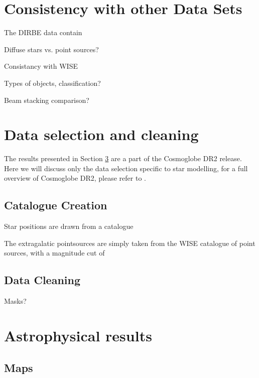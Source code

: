 \documentclass{aa}
\begin{document}
\section{Consistency with other Data Sets}
\label{sec:consistency}

The DIRBE data contain 


Diffuse stars vs. point sources? 

Consistancy with WISE

Types of objects, classification?

Beam stacking comparison?

\clearpage
\section{Data selection and cleaning}
\label{sec:data}

The results presented in Section \ref{sec:results} are a part of the Cosmoglobe DR2 release. Here we will discuss only the data selection specific to star modelling, for a full overview of Cosmoglobe DR2, please refer to  \cite{CG02_01}.

\subsection{Catalogue Creation}
\label{sec:catalogue}

Star positions are drawn from a catalogue 

The extragalatic pointsources are simply taken from the WISE catalogue of point sources, with a magnitude cut of 

\subsection{Data Cleaning}

Masks?

\clearpage
\section{Astrophysical results}
\label{sec:results}

\subsection{Maps}
\end{document}

